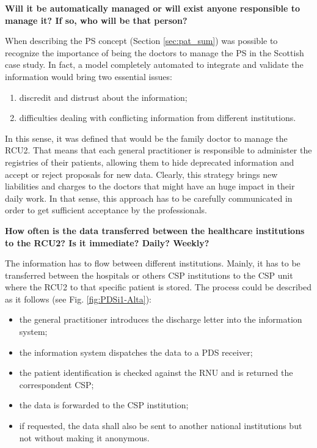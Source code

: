 \textbf{Will it be automatically managed or will exist anyone responsible to manage it? If so, who will be that person?}

When describing the PS concept (Section \ref{sec:pat_sum}) was possible to recognize the importance of being the doctors to manage the PS in the Scottish case study. In fact, a model completely automated to integrate and validate the information would bring two essential issues:
\begin{enumerate}
\item discredit and distrust about the information;
\item difficulties dealing with conflicting information from different institutions.
\end{enumerate}

In this sense, it was defined that would be the family doctor to manage the RCU2. That means that each general practitioner is responsible to administer the registries of their patients, allowing them to hide deprecated information and accept or reject proposals for new data. Clearly, this strategy brings new liabilities and charges to the doctors that might have an huge impact in their daily work. In that sense, this approach has to be carefully communicated in order to get sufficient acceptance by the professionals.




\textbf{How often is the data transferred between the healthcare institutions to the RCU2? Is it immediate? Daily? Weekly?}

The information has to flow between different institutions. Mainly, it has to be transferred between the hospitals or others CSP institutions to the CSP unit where the RCU2 to that specific patient is stored. The process could be described as it follows (see Fig. \ref{fig:PDSi1-Alta}):

\begin{itemize}
\item the general practitioner introduces the discharge letter into the information system;
\item the information system dispatches the data to a PDS receiver;
\item the patient identification is checked against the RNU and is returned the correspondent CSP;
\item the data is forwarded to the CSP institution;
\item if requested, the data shall also be sent to another national institutions but not without making it anonymous.
\end{itemize}


